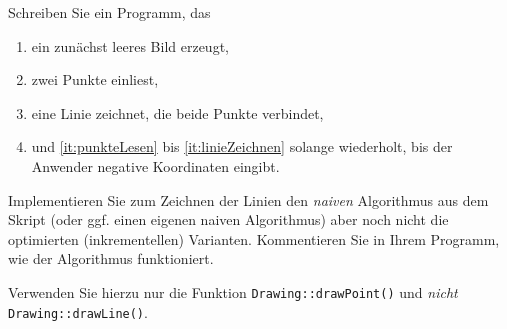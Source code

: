 %
Schreiben Sie ein Programm, das
%
\begin{enumerate}
  \item ein zunächst leeres Bild erzeugt,
  \item\label{it:punkteLesen} zwei Punkte einliest,
  \item\label{it:linieZeichnen} eine Linie zeichnet, die beide Punkte
        verbindet,
  \item und \ref{it:punkteLesen} bis \ref{it:linieZeichnen} solange
        wiederholt, bis der Anwender negative Koordinaten eingibt.
\end{enumerate}
%
Implementieren Sie zum Zeichnen der Linien den \emph{naiven}
Algorithmus aus dem Skript (oder ggf. einen eigenen naiven Algorithmus)
aber noch nicht die optimierten (inkrementellen) Varianten.
Kommentieren Sie in Ihrem Programm, wie der Algorithmus funktioniert.

Verwenden Sie hierzu nur die Funktion
\texttt{Drawing::drawPoint()} und \emph{nicht}
\texttt{Drawing::drawLine()}.

